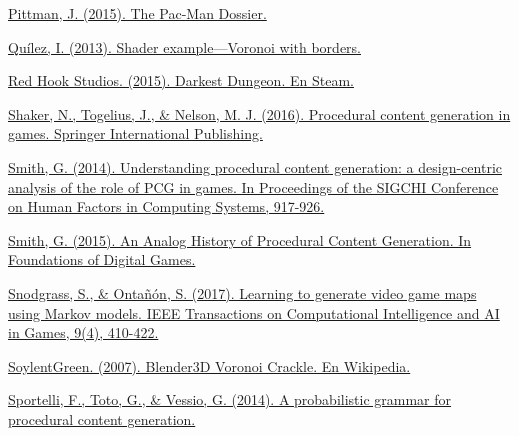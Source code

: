 \begin{thebibliography}{1}
	\href{https://pacman.holenet.info/}{Pittman, J. (2015). The Pac-Man Dossier.}
	
	
	
	\href{https://www.iquilezles.org/www/articles/voronoilines/voronoilines.htm}{Quílez, I. (2013). Shader example—Voronoi with borders.}
	
	
	
	\href{https://store.steampowered.com/app/262060/Darkest_Dungeon/}{Red Hook Studios. (2015). Darkest Dungeon. En Steam.}
	
	
	
	\href{https://doi.org/10.1007/978-3-319-42716-4}{Shaker, N., Togelius, J., \& Nelson, M. J. (2016). Procedural content generation in games. Springer International Publishing.}
	
	
	\href{https://doi.org/10.1145/2556288.2557341}{Smith, G. (2014). Understanding procedural content generation: a design-centric analysis of the role of PCG in games.  In Proceedings of the SIGCHI Conference on Human Factors in Computing Systems, 917-926.}
	
	
	\href{http://sokath.com/home/wp-content/uploads/2018/01/smith-fdg15.pdf}{Smith, G. (2015). An Analog History of Procedural Content Generation. In Foundations of Digital Games.}
	
	
	\href{https://doi.org/10.1109/TCIAIG.2016.2623560}{Snodgrass, S., \& Ontañón, S. (2017). Learning to generate video game maps using Markov models. IEEE Transactions on Computational Intelligence and AI in Games, 9(4), 410-422.}
	
	
	\href{https://commons.wikimedia.org/wiki/File:Blender3D_VoronoiCrackle.jpg}{SoylentGreen. (2007). Blender3D Voronoi Crackle. En Wikipedia.}
	
	
	\href{https://doi.org/10.13140/2.1.3820.4163}{Sportelli, F., Toto, G., \& Vessio, G. (2014). A probabilistic grammar for procedural content generation.}
	

\end{thebibliography}
